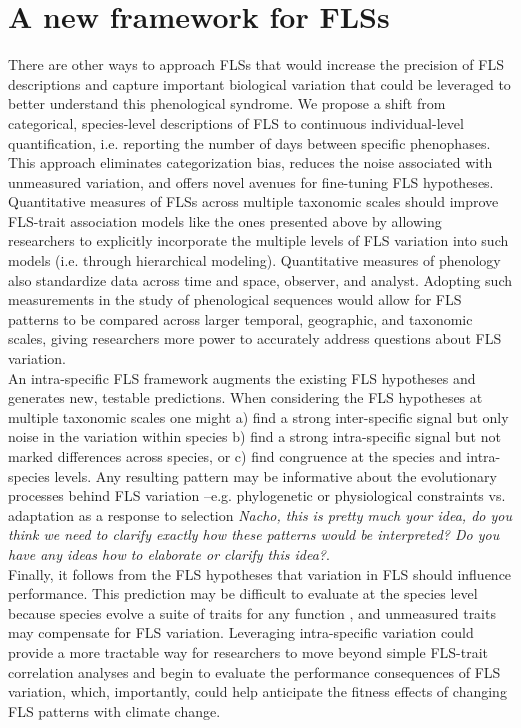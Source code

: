 \documentclass{article}
\begin{document}
\section*{A new framework for FLSs} %

\noindent There are other ways to approach FLSs that would increase the precision of FLS descriptions and capture important biological variation that could be leveraged to better understand this phenological syndrome. We propose a shift from categorical, species-level descriptions of FLS to continuous individual-level quantification, i.e. reporting the number of days between specific phenophases. This approach eliminates categorization bias, reduces the noise associated with unmeasured variation, and offers novel avenues for fine-tuning FLS hypotheses.\\ 

\noindent  Quantitative measures of FLSs across multiple taxonomic scales should improve FLS-trait association models like the ones presented above by allowing researchers to explicitly incorporate the multiple levels of FLS variation into such models (i.e. through hierarchical modeling). Quantitative measures of phenology \citep[e.g. the BBCH scale,][]{Finn2007} also standardize data across time and space, observer, and analyst. Adopting such measurements in the study of phenological sequences would allow for FLS patterns to be compared across larger temporal, geographic, and taxonomic scales, giving researchers more power to accurately address questions about FLS variation.\\

\noindent An intra-specific FLS framework augments the existing FLS hypotheses and generates new, testable predictions. When considering the FLS hypotheses at multiple taxonomic scales one might a) find a strong inter-specific signal but only noise in the variation within species b) find a strong intra-specific signal but not marked differences across species, or c) find congruence at the species and intra-species levels. Any resulting pattern may be informative about the evolutionary processes behind FLS variation --e.g. phylogenetic or physiological constraints  vs. adaptation as a response to selection \emph{Nacho, this is pretty much your idea, do you think we need to clarify exactly how these patterns would be interpreted? Do you have any ideas how to elaborate or clarify this idea?}.\\

\noindent Finally, it follows from the FLS hypotheses that variation in FLS should influence performance. This prediction may be difficult to evaluate at the species level because species evolve a suite of traits for any function \citep{Davies2019}, and unmeasured traits may compensate for FLS variation. Leveraging intra-specific variation could provide a more tractable way for researchers to move beyond simple FLS-trait correlation analyses and begin to evaluate the performance consequences of FLS variation, which, importantly, could help anticipate the fitness effects of changing FLS patterns with climate change.\\
\end{document}
